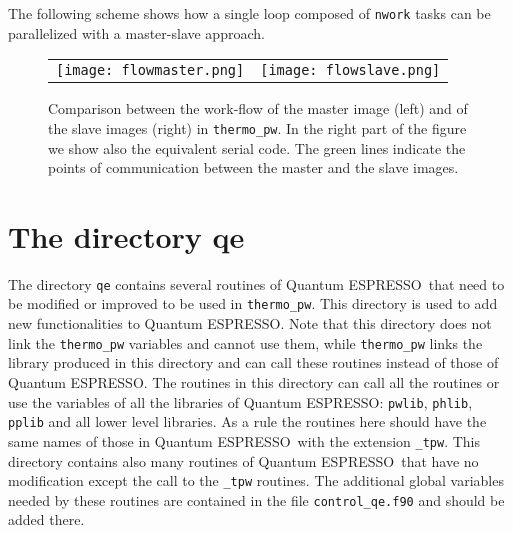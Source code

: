 \documentclass[12pt,a4paper]{article}
\def\qe{{\sc Quantum ESPRESSO}}
\begin{document}
The following scheme shows how a single loop composed of \texttt{nwork} tasks
can be parallelized with a master-slave approach.

\begin{figure*}[ht]
  \begin{tabular}[t]{ll}
    \texttt{[image: flowmaster.png]}
    &\texttt{[image: flowslave.png]}\\
  \end{tabular}
 \caption{Comparison between the work-flow of the master image (left)
 and of the slave images (right) in \texttt{thermo\_pw}. In the right
part of the figure we show also the equivalent serial code. The green lines
indicate the points of communication between the master and the slave images.
}
\label{figflow}
\end{figure*}

\newpage
\section{\color{coral}The directory qe}

The directory \texttt{qe} contains several routines of \qe\ that need to
be modified or improved to be used in \texttt{thermo\_pw}. This
directory is used to add new functionalities to \qe. Note that this directory
does not link the \texttt{thermo\_pw} variables and cannot use them, while
\texttt{thermo\_pw} links the library produced in this directory and can
call these routines instead of those of \qe. The routines in this directory
can call all the routines or use the variables of all the libraries
of \qe: \texttt{pwlib},
\texttt{phlib}, \texttt{pplib} and all lower level libraries.
As a rule the routines here should have the same names of those in \qe\ with
the extension \texttt{\_tpw}. This directory contains also many routines
of \qe\ that have no modification except the call to the \texttt{\_tpw}
routines. The additional global variables needed by these routines are
contained in the file \texttt{control\_qe.f90} and should be added there.
\end{document}
